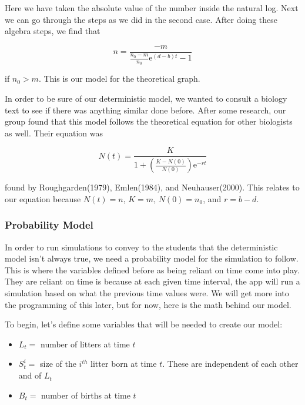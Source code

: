 \documentclass{article}\usepackage[]{graphicx}\usepackage[]{color}
\begin{document}
\noindent Here we have taken the absolute value of the number inside the natural log. Next we can go through the steps as we did in the second case. After doing these algebra steps, we find that 

\begin{equation}
n= \frac{-m}{\frac{n_0-m}{n_0}\mathrm{e}^{(d-b)t}-1}
\end{equation}

if \(n_0 > m\). This is our model for the theoretical graph. 

\bigskip

In order to be sure of our deterministic model, we wanted to consult a biology text to see if there was anything similar done before. After some research, our group found that this model follows the theoretical equation for other biologists as well. Their equation was 

\begin{equation}
N(t) = \frac{K}{1+(\frac{K-N(0)}{N(0)})\mathrm{e}^{-rt}}
\end{equation}

\noindent found by Roughgarden(1979), Emlen(1984), and Neuhauser(2000). This relates to our equation because \(N(t) = n\), \(K=m\), \(N(0)=n_0\), and \(r = b-d\).

\subsubsection{Probability Model}

In order to run simulations to convey to the students that the deterministic model isn't always true, we need a probability model for the simulation to follow. This is where the variables defined before as being reliant on time come into play. They are reliant on time is because at each given time interval, the app will run a simulation based on what the previous time values were. We will get more into the programming of this later, but for now, here is the math behind our model.

To begin, let's define some variables that will be needed to create our model:

\begin{itemize}
\item \(L_t =\) number of litters at time \(t\)

\item \(S_t^i =\) size of the \(i^{th}\) litter born at time \(t\). These are independent of each other and of \(L_t\)

\item \(B_t =\) number of births at time \(t\)
\end{itemize}
\end{document}
